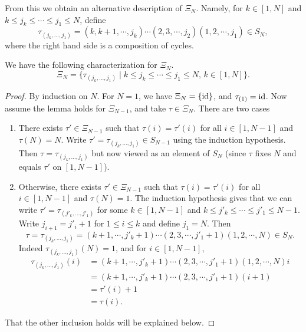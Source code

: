 From this we obtain an alternative description of $\Xi_N$. Namely, for $k\in [1, N]$
and $k \leq j_k \leq \cdots \leq j_1 \leq N$, define
\begin{equation*}
	\tau_{(j_k, \dots, j_1)} = (k,k+1, \cdots, j_k)\cdots (2,3, \cdots, j_2)(1,2,\cdots, j_1)\in S_N,
\end{equation*}
%
where the right hand side is a composition of cycles.
\begin{lemma}
	We have the following characterization for $\Xi_N$.
	\begin{equation*}
		\Xi_N = \{\tau_{(j_k, \dots, j_1)} \mid k \leq j_k \leq \cdots \leq j_1 \leq N,\, k\in [1, N]\}.
	\end{equation*}
\end{lemma}
\begin{proof}
	By induction on $N$. For $N = 1$, we have $\Xi_N = \{\operatorname{id}\}$, and $\tau_{(1)} = \operatorname{id}$. Now assume the lemma holds for $\Xi_{N-1}$, and take $\tau \in \Xi_N$. There are two cases
	\begin{enumerate}
		\item There exists $\tau' \in \Xi_{N-1}$ such that $\tau(i) = \tau'(i)$ for all $i\in [1,
				      N-1]$ and $\tau(N) = N$. Write $\tau' = \tau_{(j_k, \dots, j_1)} \in S_{N-1}$ using the
		      induction hypothesis. Then $\tau = \tau_{(j_k, \dots, j_1)}$ but now viewed as an
		      element of $S_N$ (since $\tau$ fixes $N$ and equals $\tau'$ on $[1, N-1]$).
		\item Otherwise, there exists $\tau' \in \Xi_{N-1}$ such that $\tau(i) = \tau'(i)$ for all
		      $i\in [1, N-1]$ and $\tau(N) = 1$. The induction hypothesis gives that we can write
		      $\tau' = \tau_{(j'_k, \dots, j'_1)}$ for some $k \in [1, N - 1]$ and $k \leq j'_k \leq
			      \cdots \leq j'_1 \leq N - 1$. Write $j_{i+1} = j'_i + 1$ for $1 \leq i \leq k$ and
		      define $j_1 = N$. Then
		      \begin{equation*}
			      \tau = \tau_{(j_k, \dots, j_1)} = (k+1, \cdots, j'_k + 1) \cdots (2, 3, \cdots ,j'_1 + 1)(1,2, \cdots, N) \in S_N.
		      \end{equation*}
		      Indeed $\tau_{(j_k, \dots, j_1)}(N) = 1$, and for $i \in [1, N-1]$,
		      \begin{align*}
			      \tau_{(j_k, \dots, j_1)}(i)
			       & = (k+1, \cdots, j'_k + 1) \cdots (2, 3, \cdots, j'_1 + 1)(1,2, \cdots, N) i \\
			       & = (k+1, \cdots, j'_k + 1) \cdots (2, 3, \cdots, j'_1 + 1) (i+1)             \\
			       & = \tau'(i) + 1                                                              \\
			       & = \tau(i).
		      \end{align*}
	\end{enumerate}

	That the other inclusion holds will be explained below.
\end{proof}

